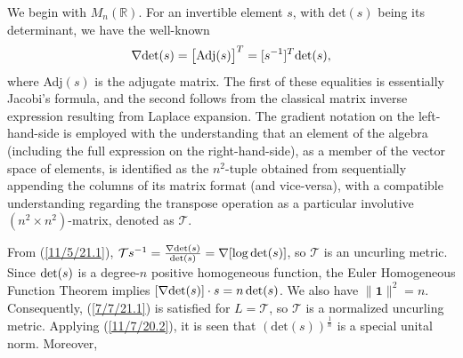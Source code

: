 \documentclass{amsart}
\numberwithin{equation}{section}
\theoremstyle{definition}
\numberwithin{theorem}{section}
\begin{document}
 We begin with $ M_n(\mathbb{R})$. For an invertible element $s$, with det$(s)$ being its determinant, we have the well-known
  \begin{equation}\label{11/5/21.1} \nabla \mbox{det}(s) = \big[{\rm Adj}(s)\big]^T = [s^{-1}]^T\mbox{det}(s),\end{equation} where Adj$(s)$ is the adjugate matrix.  The first of these equalities is essentially Jacobi's formula, and the second follows from the classical matrix inverse expression resulting from Laplace expansion.  The gradient notation on the left-hand-side is employed with the understanding that an element of the algebra (including the full expression on the right-hand-side), as a member of the vector space of elements, is identified as the $n^2$-tuple obtained from sequentially appending the columns of its matrix format (and vice-versa), with a compatible understanding regarding the transpose operation as a particular involutive $(n^2\times n^2)$-matrix, denoted as $\mathcal{T}$. 
  
From (\ref{11/5/21.1}), $\mathcal{T}s^{-1} = \frac{\nabla{\rm det}(s)}{{\rm det}(s)} = \nabla[\log{\rm det}(s)]$, so $\mathcal{T}$ is an uncurling metric.  Since ${\rm det}(s)$ is a degree-$n$ positive homogeneous function, the Euler Homogeneous Function Theorem implies $[\nabla{\rm det}(s)]\cdot s = n \,{\rm det}(s)$.  We also have $\|\mathbf{1}\|^2 = n$.  Consequently, (\ref{7/7/21.1}) is satisfied for $L=\mathcal{T}$, so $\mathcal{T}$ is a normalized uncurling metric.  Applying (\ref{11/7/20.2}), it is seen that $(\text{det}(s))^{\frac{1}{n}}$ is a special unital norm.
  Moreover,
 
\end{document}
